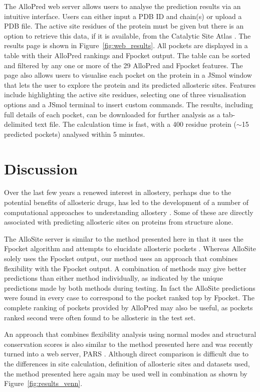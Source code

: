 The AlloPred web server allows users to analyse the prediction results via an intuitive interface.
Users can either input a PDB ID and chain(s) or upload a PDB file.
The active site residues of the protein must be given but there is an option to retrieve this data, if it is available, from the Catalytic Site Atlas \cite{Furnham2014}.
The results page is shown in Figure~\ref{fig:web_results}.
All pockets are displayed in a table with their AlloPred rankings and Fpocket output.
The table can be sorted and filtered by any one or more of the 29 AlloPred and Fpocket features.
The page also allows users to visualise each pocket on the protein in a JSmol window that lets the user to explore the protein and its predicted allosteric sites.
Features include highlighting the active site residues, selecting one of three visualisation options and a JSmol terminal to insert custom commands.
The results, including full details of each pocket, can be downloaded for further analysis as a tab-delimited text file.
The calculation time is fast, with a 400 residue protein ($\sim$15 predicted pockets) analysed within 5 minutes.


\section{Discussion}

Over the last few years a renewed interest in allostery, perhaps due to the potential benefits of allosteric drugs, has led to the development of a number of computational approaches to understanding allostery \cite{Collier2013}.
Some of these are directly associated with predicting allosteric sites on proteins from structure alone.

The AlloSite server is similar to the method presented here in that it uses the Fpocket algorithm and attempts to elucidate allosteric pockets \cite{Huang2013}.
Whereas AlloSite solely uses the Fpocket output, our method uses an approach that combines flexibility with the Fpocket output.
A combination of methods may give better predictions than either method individually, as indicated by the unique predictions made by both methods during testing.
In fact the AlloSite predictions were found in every case to correspond to the pocket ranked top by Fpocket.
The complete ranking of pockets provided by AlloPred may also be useful, as pockets ranked second were often found to be allosteric in the test set.

An approach that combines flexibility analysis using normal modes and structural conservation scores \cite{Panjkovich2012} is also similar to the method presented here and  was recently turned into a web server, PARS \cite{Panjkovich2014}.
Although direct comparison is difficult due to the differences in site calculation, definition of allosteric sites and datasets used, the method presented here again may be used well in combination as shown by Figure~\ref{fig:results_venn}.

